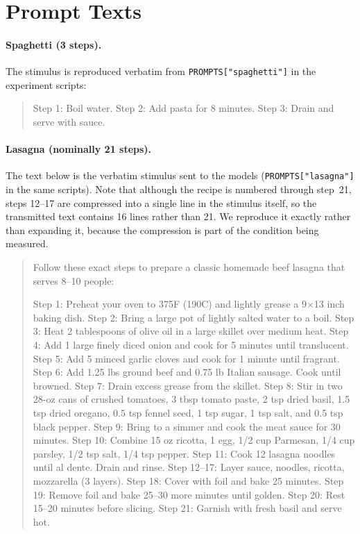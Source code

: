 \documentclass[11pt]{article}
\begin{document}




\clearpage
\appendix

\section{Prompt Texts}
\label{app:prompts}

\paragraph{Spaghetti (3 steps).}
The stimulus is reproduced verbatim from \texttt{PROMPTS["spaghetti"]} in the
experiment scripts:
\begin{quote}
Step 1: Boil water. Step 2: Add pasta for 8 minutes. Step 3: Drain and serve
with sauce.
\end{quote}

\paragraph{Lasagna (nominally 21 steps).}
The text below is the verbatim stimulus sent to the models
(\texttt{PROMPTS["lasagna"]} in the same scripts). Note that
although the recipe is numbered through step~21, steps 12--17 are compressed
into a single line in the stimulus itself, so the transmitted text contains
16 lines rather than 21. We reproduce it exactly rather than expanding it,
because the compression is part of the condition being measured.
\begin{quote}
\small
Follow these exact steps to prepare a classic homemade beef lasagna that serves
8--10 people:

Step 1: Preheat your oven to 375\textdegree F (190\textdegree C) and lightly
grease a 9$\times$13 inch baking dish.
Step 2: Bring a large pot of lightly salted water to a boil.
Step 3: Heat 2 tablespoons of olive oil in a large skillet over medium heat.
Step 4: Add 1 large finely diced onion and cook for 5 minutes until translucent.
Step 5: Add 5 minced garlic cloves and cook for 1 minute until fragrant.
Step 6: Add 1.25 lbs ground beef and 0.75 lb Italian sausage. Cook until browned.
Step 7: Drain excess grease from the skillet.
Step 8: Stir in two 28-oz cans of crushed tomatoes, 3 tbsp tomato paste, 2 tsp
dried basil, 1.5 tsp dried oregano, 0.5 tsp fennel seed, 1 tsp sugar, 1 tsp salt,
and 0.5 tsp black pepper.
Step 9: Bring to a simmer and cook the meat sauce for 30 minutes.
Step 10: Combine 15 oz ricotta, 1 egg, 1/2 cup Parmesan, 1/4 cup parsley,
1/2 tsp salt, 1/4 tsp pepper.
Step 11: Cook 12 lasagna noodles until al dente. Drain and rinse.
Step 12--17: Layer sauce, noodles, ricotta, mozzarella (3 layers).
Step 18: Cover with foil and bake 25 minutes.
Step 19: Remove foil and bake 25--30 more minutes until golden.
Step 20: Rest 15--20 minutes before slicing.
Step 21: Garnish with fresh basil and serve hot.
\end{quote}
\end{document}
